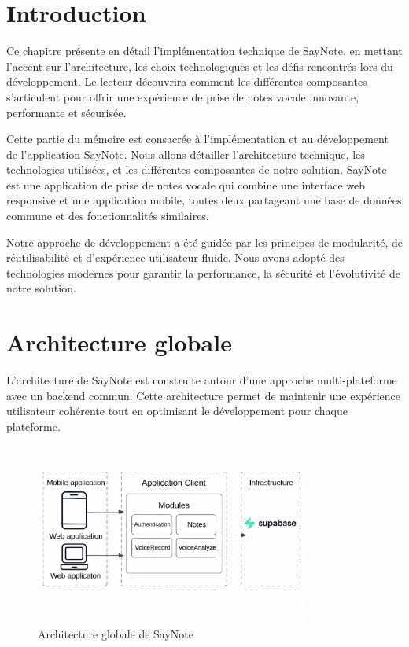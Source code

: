 
\section*{Introduction}
Ce chapitre présente en détail l'implémentation technique de SayNote, en mettant l'accent sur l'architecture, les choix technologiques et les défis rencontrés lors du développement. Le lecteur découvrira comment les différentes composantes s'articulent pour offrir une expérience de prise de notes vocale innovante, performante et sécurisée.

Cette partie du mémoire est consacrée à l'implémentation et au développement de l'application SayNote. Nous allons détailler l'architecture technique, les technologies utilisées, et les différentes composantes de notre solution. SayNote est une application de prise de notes vocale qui combine une interface web responsive et une application mobile, toutes deux partageant une base de données commune et des fonctionnalités similaires.

Notre approche de développement a été guidée par les principes de modularité, de réutilisabilité et d'expérience utilisateur fluide. Nous avons adopté des technologies modernes pour garantir la performance, la sécurité et l'évolutivité de notre solution.

\section{Architecture globale}
L'architecture de SayNote est construite autour d'une approche multi-plateforme avec un backend commun. Cette architecture permet de maintenir une expérience utilisateur cohérente tout en optimisant le développement pour chaque plateforme.

\begin{figure}[H]
    \centering
    \includegraphics[width=0.8\textwidth]{assets/docs/golobal-diagrams/global-architecture.jpg}
    \caption{Architecture globale de SayNote}
    \label{fig:global-architecture}
\end{figure}

